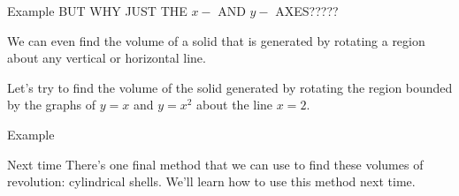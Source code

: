 \documentclass[presentation]{beamer}
\begin{document}
\begin{frame}[label={sec:org2071299}]{Example}
BUT WHY JUST THE \(x-\) AND \(y-\) AXES?????

We can even find the volume of a solid that is generated by rotating a
region about any vertical or horizontal line.

Let's try to find the volume of the solid generated by rotating the
region bounded by the graphs of \(y = x\) and \(y = x^2\) about the
line \(x = 2\).

\vspace{10in}
\end{frame}

\begin{frame}[label={sec:org86a62b9}]{Example}
\end{frame}

\begin{frame}[label={sec:org75a366e}]{Next time}
There's one final method that we can use to find these volumes of
revolution: cylindrical shells.  We'll learn how to use this method
next time.
\end{frame}
\end{document}
